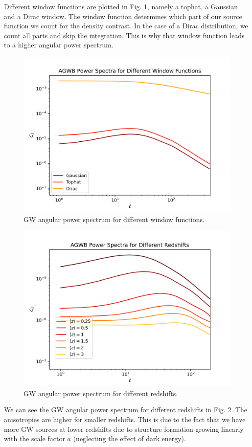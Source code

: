 Different window functions are plotted in Fig. \ref{plot_Cl_window_fct}, namely a tophat, a Gaussian and a Dirac window. The window function determines which part of our source function we count for the density contrast. In the case of a Dirac distribution, we count all parts and skip the integration. This is why that window function leads to a higher angular power spectrum.\\
\begin{figure}[h!]
 \centering
 \includegraphics[width=0.7\linewidth]{Images/diff_windows.png}
 \caption{GW angular power spectrum for different window functions.}
 \label{plot_Cl_window_fct}
\end{figure} 

\begin{figure}[h!]
 \centering
 \includegraphics[width=0.7\linewidth]{Images/diff_window_z.png}
 \caption{GW angular power spectrum for different redshifts.}
 \label{plot_Cl_redshift}
\end{figure} 


We can see the GW angular power spectrum for different redshifts in Fig. \ref{plot_Cl_redshift}.
The anisotropies are higher for smaller redshifts. This is due to the fact that we have more GW sources at lower redshifts due to structure formation growing linearly with the scale factor $a$ (neglecting the effect of dark energy).



